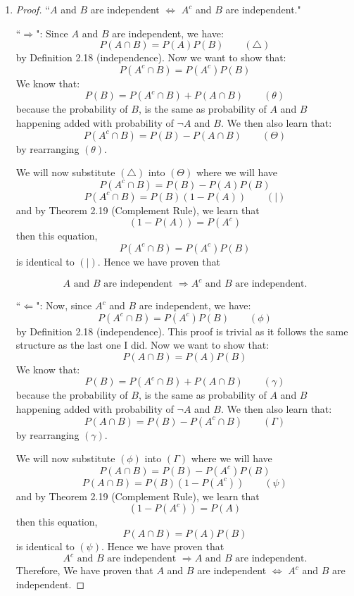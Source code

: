 \documentclass[12pt]{article}
\begin{document}
\begin{enumerate}
	\item 
	\begin{proof}
	``$A$ and $B$ are independent $\Leftrightarrow$ $A^{c}$ and $B$ are independent."
	
	``$\Rightarrow$": Since $A$ and $B$ are independent, we have:
	$$P(A \cap B) = P(A)P(B) \qquad (\triangle)$$ 
	by Definition 2.18 (independence).
	Now we want to show that:
	$$P(A^{c} \cap B) = P(A^{c})P(B)$$
	We know that:
	$$P(B) = P(A^{c} \cap B) + P(A \cap B) \qquad (\theta)$$ 
	because the probability of $B$, is the same as probability of $A$ and $B$ happening added with probability of $\neg A$ and $B$. We then also learn that:
	$$P(A^{c} \cap B) = P(B) - P(A \cap B) \qquad (\Theta)$$
	by rearranging $(\theta)$. 
	
	We will now substitute $(\triangle)$ into $(\Theta)$  where we will have
	$$P(A^{c} \cap B) = P(B) - P(A)P(B)$$
	$$P(A^{c} \cap B) = P(B)(1 - P(A)) \qquad (\vert)$$
	and by Theorem 2.19 (Complement Rule), we learn that
	$$(1 - P(A)) = P(A^{c})$$
	then this equation,
	$$P(A^{c} \cap B) = P(A^{c})P(B)$$
	is identical to $(\vert)$. Hence we have proven that 
	
	$$A \text{ and } B \text{ are independent } \Rightarrow A^{c} \text{ and } B \text{ are independent.}$$ 

	``$\Leftarrow$": Now, since $A^c$ and $B$ are independent, we have:
	$$P(A^c \cap B) = P(A^c)P(B) \qquad (\phi)$$ 
	by Definition 2.18 (independence). This proof is trivial as it follows the same structure as the last one I did.
	Now we want to show that:
	$$P(A \cap B) = P(A)P(B)$$
	We know that:
	$$P(B) = P(A^{c} \cap B) + P(A \cap B) \qquad (\gamma)$$ 
	because the probability of $B$, is the same as probability of $A$ and $B$ happening added with probability of $\neg A$ and $B$. We then also learn that:
	$$P(A \cap B) = P(B) - P(A^c \cap B) \qquad (\Gamma)$$
	by rearranging $(\gamma)$. 
	
	We will now substitute $(\phi)$ into $(\Gamma)$  where we will have
	$$P(A \cap B) = P(B) - P(A^c)P(B)$$
	$$P(A \cap B) = P(B)(1 - P(A^c)) \qquad (\psi)$$
	and by Theorem 2.19 (Complement Rule), we learn that
	$$(1 - P(A^c)) = P(A)$$
	then this equation,
	$$P(A \cap B) = P(A)P(B)$$
	is identical to $(\psi)$. Hence we have proven that 
	$$A^{c} \text{ and } B \text{ are independent } \Rightarrow A \text{ and } B \text{ are independent.} $$ 
	Therefore, We have proven that $A$ and $B$ are independent $\Leftrightarrow$ $A^c$ and $B$ are independent. \qedhere 
	\end{proof}
	

\end{enumerate}
\end{document}
